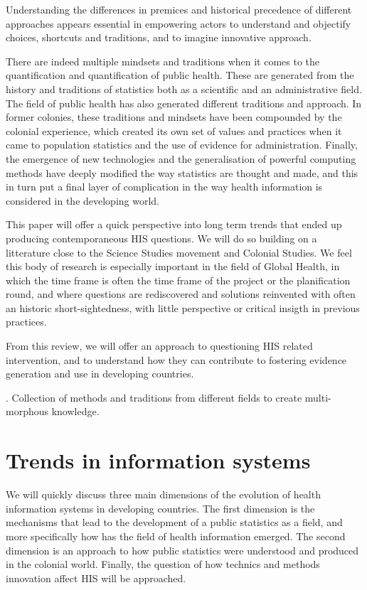 \documentclass[letterpaper, 10 pt, conference]{IEEEconf}  %
\begin{document}
Understanding the differences in premices and historical precedence of different approaches appears essential in empowering actors to understand and objectify choices, shortcuts and traditions, and to imagine innovative approach.

There are indeed multiple mindsets and traditions when it comes to the quantification and quantification of public health. These are generated from the history and traditions of statistics both as a scientific and an administrative field. The field of public health has also generated different traditions and approach. In former colonies, these traditions and mindsets have been compounded by the colonial experience, which created its own set of values and practices when it came to population statistics and the use of evidence for administration. Finally, the emergence of new technologies and the generalisation of powerful computing methods have deeply modified the way statistics are thought and made, and this in turn put a final layer of complication in the way health information is considered in the developing world.

This paper will offer a quick perspective into long term trends that ended up producing contemporaneous HIS questions. We will do so building on a litterature close to the Science Studies movement and Colonial Studies. We feel this body of research is especially important in the field of Global Health, in which the time frame is often the time frame of the project or the planification round, and where questions are rediscovered and solutions reinvented with often an historic short-sightedness, with little perspective or critical insigth in previous practices.

From this review, we will offer an approach to questioning HIS related intervention, and to understand how they can contribute to fostering evidence generation and use in developing countries.

\cite{vital_wave_consulting_health_2009}. Collection of methods and traditions from different fields to create multi-morphous knowledge. \cite{bergeron_savoirs_2014}

\section{Trends in information systems}

We will quickly discuss three main dimensions of the evolution of health information systems in developing countries. The first dimension is the mechanisms that lead to the development of a public statistics as a field, and more specifically how has the field of health information emerged. The second dimension is an approach to how public statistics were understood and produced in the colonial world. Finally, the question of how technics and methods innovation affect HIS will be approached.
\end{document}
